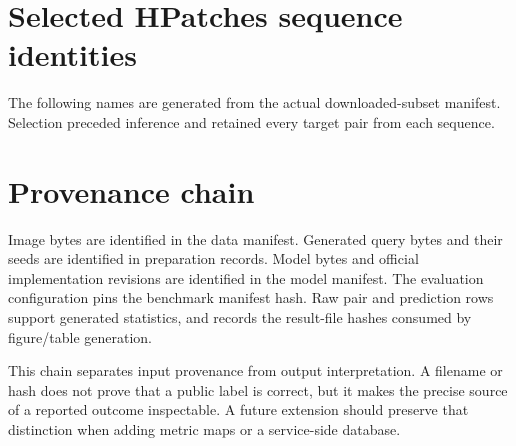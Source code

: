 \section{Selected HPatches sequence identities}
The following names are generated from the actual downloaded-subset manifest. Selection preceded inference and retained every target pair from each sequence.
\begin{small}\end{small}

\section{Provenance chain}
Image bytes are identified in the data manifest. Generated query bytes and their seeds are identified in preparation records. Model bytes and official implementation revisions are identified in the model manifest. The evaluation configuration pins the benchmark manifest hash. Raw pair and prediction rows support generated statistics, and  records the result-file hashes consumed by figure/table generation.

This chain separates input provenance from output interpretation. A filename or hash does not prove that a public label is correct, but it makes the precise source of a reported outcome inspectable. A future extension should preserve that distinction when adding metric maps or a service-side database.
